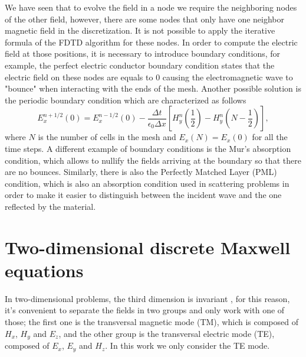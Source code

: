 \documentclass[12pt, oneside]{book}
\begin{document}
We have seen that to evolve the field in a node we require the neighboring nodes of the other field, however, there are some nodes that only have one neighbor magnetic field in the discretization. It is not possible to apply the iterative formula of the FDTD algorithm for these nodes. In order to compute the electric field at those positions, it is necessary to introduce boundary conditions, for example, the perfect electric conductor boundary condition states that the electric field on these nodes are equals to $0$ causing the electromagnetic wave to "bounce" when interacting with the ends of the mesh. Another possible solution is the periodic boundary condition which are characterized as follows
\begin{equation}
    E_x^{n+1/2}(0) = E_x^{n-1/2}(0) - \dfrac{\Delta t}{\epsilon_0 \Delta x}\left[H_{y}^{n}\left(\frac{1}{2}\right)-H_{y}^{n}\left(N-\frac{1}{2}\right)\right],
\end{equation} 
where $N$ is the number of cells in the mesh and $E_x(N) = E_x(0)$ for all the time steps. A different example of boundary conditions is the Mur's absorption condition, which allows to nullify the fields arriving at the boundary so that there are no bounces. Similarly, there is also the Perfectly Matched Layer (PML) condition, which is also an absorption condition used in scattering problems in order to make it easier to distinguish between the incident wave and the one reflected by the material.


\section{Two-dimensional discrete Maxwell equations}

In two-dimensional problems, the third dimension is invariant \cite{peterson1992electromagnetic}, for this reason, it's convenient to separate the fields in two groups and only work with one of those; the first one is the transversal magnetic mode (TM), which is composed of $H_x$, $H_y$ and $E_z$, and the other group is the transversal electric mode (TE), composed of $E_x$, $E_y$ and $H_z$. In this work we only consider the TE mode.
\end{document}
